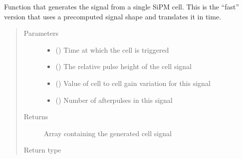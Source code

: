 \documentclass[letterpaper,10pt,english]{sphinxmanual}
\begin{document}
\begin{fulllineitems}
\label{\detokenize{structure:libs.lib.PulseCPU}}
Function that generates the signal from a single SiPM cell.
This is the “fast” version that uses a pre\sphinxhyphen{}computed signal
shape and translates it in time.
\begin{quote}\begin{description}
\item[{Parameters}] \leavevmode\begin{itemize}
\item {} 
 () \textendash{} Time at which the cell is triggered

\item {} 
 () \textendash{} The relative pulse height of the cell signal

\item {} 
 () \textendash{} Value of cell to cell gain variation for this signal

\item {} 
 () \textendash{} Number of afterpulses in this signal

\end{itemize}

\item[{Returns}] \leavevmode
{} \textendash{} Array containing the generated cell signal

\item[{Return type}] \leavevmode
{}

\end{description}\end{quote}

\end{fulllineitems}

\end{document}
